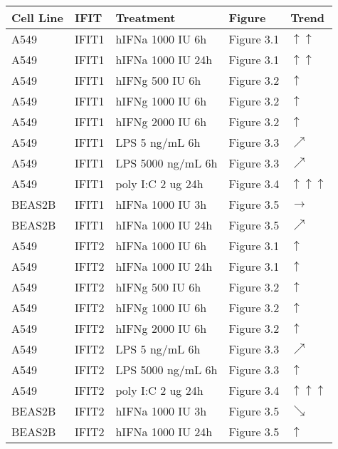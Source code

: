 \begin{table}
    \centering
    \begin{tabular}{lllll}
    \hline
        \textbf{Cell Line} & \textbf{IFIT} & \textbf{Treatment} & \textbf{Figure} & \textbf{Trend} \\ \hline
        A549 & IFIT1 & hIFNa 1000 IU 6h & Figure 3.1 & \(\uparrow\)\(\uparrow\) \\ 
        A549 & IFIT1 & hIFNa 1000 IU 24h & Figure 3.1 & \(\uparrow\)\(\uparrow\) \\ 
        A549 & IFIT1 & hIFNg 500 IU 6h & Figure 3.2 & \(\uparrow\) \\ 
        A549 & IFIT1 & hIFNg 1000 IU 6h & Figure 3.2 & \(\uparrow\) \\ 
        A549 & IFIT1 & hIFNg 2000 IU 6h & Figure 3.2 & \(\uparrow\) \\ 
        A549 & IFIT1 & LPS 5 ng/mL 6h & Figure 3.3 & \(\nearrow\) \\ 
        A549 & IFIT1 & LPS 5000 ng/mL 6h & Figure 3.3 & \(\nearrow\) \\ 
        A549 & IFIT1 & poly I:C 2 ug 24h & Figure 3.4 & \(\uparrow\)\(\uparrow\)\(\uparrow\) \\ 
        BEAS2B & IFIT1 & hIFNa 1000 IU 3h & Figure 3.5 & \(\rightarrow\) \\ 
        BEAS2B & IFIT1 & hIFNa 1000 IU 24h & Figure 3.5 & \(\nearrow\) \\ 
        A549 & IFIT2 & hIFNa 1000 IU 6h & Figure 3.1 & \(\uparrow\) \\ 
        A549 & IFIT2 & hIFNa 1000 IU 24h & Figure 3.1 & \(\uparrow\) \\ 
        A549 & IFIT2 & hIFNg 500 IU 6h & Figure 3.2 & \(\uparrow\) \\ 
        A549 & IFIT2 & hIFNg 1000 IU 6h & Figure 3.2 & \(\uparrow\) \\ 
        A549 & IFIT2 & hIFNg 2000 IU 6h & Figure 3.2 & \(\uparrow\) \\ 
        A549 & IFIT2 & LPS 5 ng/mL 6h & Figure 3.3 & \(\nearrow\) \\ 
        A549 & IFIT2 & LPS 5000 ng/mL 6h & Figure 3.3 & \(\uparrow\) \\ 
        A549 & IFIT2 & poly I:C 2 ug 24h & Figure 3.4 & \(\uparrow\)\(\uparrow\)\(\uparrow\) \\ 
        BEAS2B & IFIT2 & hIFNa 1000 IU 3h & Figure 3.5 & \(\searrow\) \\ 
        BEAS2B & IFIT2 & hIFNa 1000 IU 24h & Figure 3.5 & \(\uparrow\) \\ 

\end{tabular}
\end{table}
